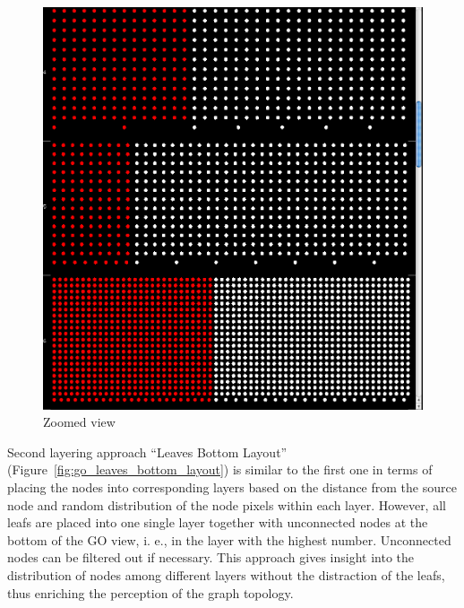 \begin{figure}[h!]
\centering
\includegraphics[scale=0.3]{pictures/go_levels_layout_zoomed.png}
\caption{Zoomed view}
\label{fig:go_levels_layout_zoomed}
\end{figure}

Second layering approach ``Leaves Bottom Layout''
(Figure~\ref{fig:go_leaves_bottom_layout}) is similar to the first one in terms of placing the nodes into corresponding layers based on the distance
from the source node and random distribution of the node pixels within each layer.
However, all leafs are placed into one single layer together with unconnected nodes at the bottom of the GO view, i. e., in the layer with the highest number.
Unconnected nodes can be filtered out if necessary. This approach gives insight into the distribution of nodes among different layers without the distraction of the leafs,
thus enriching the perception of the graph topology.

